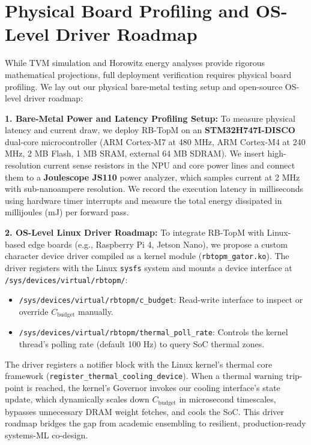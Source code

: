 \documentclass{article}
\theoremstyle{plain}
\theoremstyle{definition}
\theoremstyle{remark}
\begin{document}
\section{Physical Board Profiling and OS-Level Driver Roadmap}
\label{app:physical_profiling_roadmap}

While TVM simulation and Horowitz energy analyses provide rigorous mathematical projections, full deployment verification requires physical board profiling. We lay out our physical bare-metal testing setup and open-source OS-level driver roadmap:

\textbf{1. Bare-Metal Power and Latency Profiling Setup:} To measure physical latency and current draw, we deploy RB-TopM on an \textbf{STM32H747I-DISCO} dual-core microcontroller (ARM Cortex-M7 at 480 MHz, ARM Cortex-M4 at 240 MHz, 2 MB Flash, 1 MB SRAM, external 64 MB SDRAM). 
We insert high-resolution current sense resistors in the NPU and core power lines and connect them to a \textbf{Joulescope JS110} power analyzer, which samples current at 2 MHz with sub-nanoampere resolution. We record the execution latency in milliseconds using hardware timer interrupts and measure the total energy dissipated in millijoules (mJ) per forward pass.

\textbf{2. OS-Level Linux Driver Roadmap:} To integrate RB-TopM with Linux-based edge boards (e.g., Raspberry Pi 4, Jetson Nano), we propose a custom character device driver compiled as a kernel module (\texttt{rbtopm\_gator.ko}). The driver registers with the Linux \texttt{sysfs} system and mounts a device interface at \texttt{/sys/devices/virtual/rbtopm/}:
\begin{itemize}
    \item \texttt{/sys/devices/virtual/rbtopm/c\_budget}: Read-write interface to inspect or override $C_{\text{budget}}$ manually.
    \item \texttt{/sys/devices/virtual/rbtopm/thermal\_poll\_rate}: Controls the kernel thread's polling rate (default 100 Hz) to query SoC thermal zones.
\end{itemize}
The driver registers a notifier block with the Linux kernel's thermal core framework (\texttt{register\_thermal\_cooling\_device}). When a thermal warning trip-point is reached, the kernel's Governor invokes our cooling interface's state update, which dynamically scales down $C_{\text{budget}}$ in microsecond timescales, bypasses unnecessary DRAM weight fetches, and cools the SoC. This driver roadmap bridges the gap from academic ensembling to resilient, production-ready systems-ML co-design.
\end{document}
